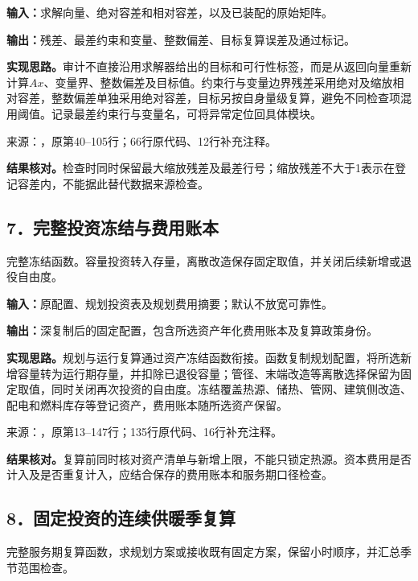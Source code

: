 \noindent\textbf{输入：}求解向量、绝对容差和相对容差，以及已装配的原始矩阵。\par
\noindent\textbf{输出：}残差、最差约束和变量、整数偏差、目标复算误差及通过标记。\par

\noindent\textbf{实现思路。}审计不直接沿用求解器给出的目标和可行性标签，而是从返回向量重新计算$Ax$、变量界、整数偏差及目标值。约束行与变量边界残差采用绝对及缩放相对容差，整数偏差单独采用绝对容差，目标另按自身量级复算，避免不同检查项混用阈值。记录最差约束行与变量名，可将异常定位回具体模块。

{\small 来源：，原第40--105行；66行原代码、12行补充注释。}\par

\begingroup
{}

\endgroup

\noindent\textbf{结果核对。}检查时同时保留最大缩放残差及最差行号；缩放残差不大于1表示在登记容差内，不能据此替代数据来源检查。

\subsection*{7．完整投资冻结与费用账本}
完整冻结函数。容量投资转入存量，离散改造保存固定取值，并关闭后续新增或退役自由度。

\noindent\textbf{输入：}原配置、规划投资表及规划费用摘要；默认不放宽可靠性。\par
\noindent\textbf{输出：}深复制后的固定配置，包含所选资产年化费用账本及复算政策身份。\par

\noindent\textbf{实现思路。}规划与运行复算通过资产冻结函数衔接。函数复制规划配置，将所选新增容量转为运行期存量，并扣除已退役容量；管径、末端改造等离散选择保留为固定取值，同时关闭再次投资的自由度。冻结覆盖热源、储热、管网、建筑侧改造、配电和燃料库存等登记资产，费用账本随所选资产保留。

{\small 来源：，原第13--147行；135行原代码、16行补充注释。}\par

\begingroup
{}

\endgroup

\noindent\textbf{结果核对。}复算前同时核对资产清单与新增上限，不能只锁定热源。资本费用是否计入及是否重复计入，应结合保存的费用账本和服务期口径检查。

\subsection*{8．固定投资的连续供暖季复算}
完整服务期复算函数，求规划方案或接收既有固定方案，保留小时顺序，并汇总季节范围检查。

